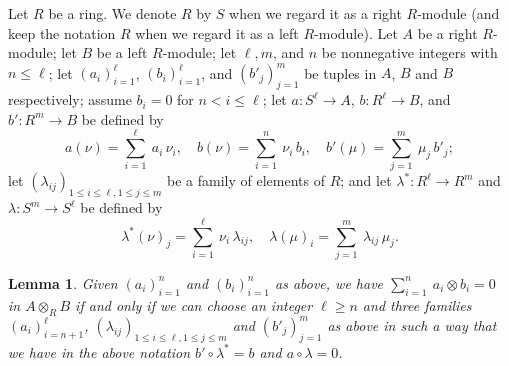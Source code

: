 \documentclass[12pt]{article}
\newtheorem{lem}[thm]{Lemma}
\theoremstyle{remark}
\theoremstyle{definition}
\begin{document}
Let $R$ be a ring. We denote $R$ by $S$ when we regard it as a right $R$-module (and keep the notation $R$ when we regard it as a left $R$-module). Let $A$ be a right $R$-module; let $B$ be a left $R$-module; let $\ell,m$, and $n$ be nonnegative integers with $n\le\ell$; let $(a_i)_{i=1}^\ell$, $(b_i)_{i=1}^\ell$, and $(b'_j)_{j=1}^m$ be tuples in $A$, $B$ and $B$ respectively; assume $b_i=0$ for $n<i\le\ell$; let $a:S^\ell\to A$, $b:R^\ell\to B$, and $b':R^m\to B$ be defined by 
$$
a(\nu)=\sum_{i=1}^\ell\ a_i\,\nu_i,\quad b(\nu)=\sum_{i=1}^n\ \nu_i\,b_i,\quad b'(\mu)=\sum_{j=1}^m\ \mu_j\,b'_j;
$$ 
let $(\lambda_{ij})_{1\le i\le\ell,1\le j\le m}$ be a family of elements of $R$; and let $\lambda^*:R^\ell\to R^m$ and $\lambda:S^m\to S^\ell$ be defined by 
$$
\lambda^*(\nu)_j=\sum_{i=1}^\ell\ \nu_i\,\lambda_{ij},\quad
\lambda(\mu)_i=\sum_{j=1}^m\ \lambda_{ij}\,\mu_j.
$$
%
\begin{lem}\label{techlem}
Given $(a_i)_{i=1}^n$ and $(b_i)_{i=1}^n$ as above, we have $\sum_{i=1}^n\ a_i\otimes b_i=0$ in $A\otimes_RB$ if and only if we can choose an integer $\ell\ge n$ and three families $(a_i)_{i=n+1}^\ell$, $(\lambda_{ij})_{1\le i\le\ell,1\le j\le m}$ and $(b'_j)_{j=1}^m$ as above in such a way that we have in the above notation $b'\circ\lambda^*=b$ and $a\circ\lambda=0$.
\end{lem}
%
\end{document}
